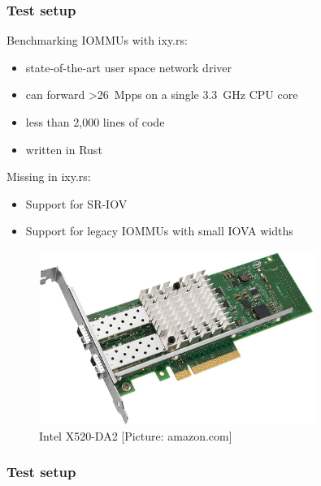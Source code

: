 \begin{frame}
    \frametitle{Test setup}

    \begin{minipage}{0.5\textwidth}
        Benchmarking IOMMUs with ixy.rs:

        \begin{itemize}
            \item state-of-the-art user space network driver
            \item can forward >\SI{26}{Mpps} on a single \SI{3.3}{\giga\hertz}
                CPU core
            \item less than 2,000 lines of code
            \item written in Rust
        \end{itemize}

        \vspace{2em}

        Missing in ixy.rs:

        \begin{itemize}
            \item Support for SR-IOV
            \item Support for legacy IOMMUs with small IOVA widths
        \end{itemize}
    \end{minipage}%
    \begin{minipage}[c]{0.5\textwidth}
        \begin{figure}
            \centering
            \includegraphics[width=0.8\textwidth,clip,trim=0cm 0cm 0cm
            0cm]{pics/intel_x520_da2.jpg}
            \caption{Intel X520-DA2 [Picture: amazon.com]}
        \end{figure}
    \end{minipage}
\end{frame}

\begin{frame}
    \frametitle{Test setup}

    \centering
\end{frame}

